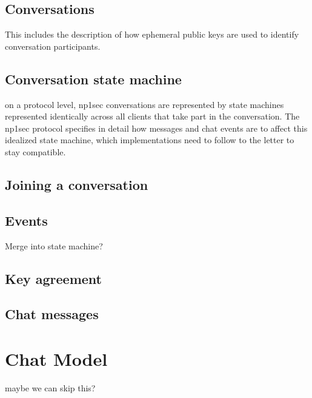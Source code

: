 \documentclass{article}
\begin{document}

\subsection{Conversations}
This includes the description of how ephemeral public keys are used to identify conversation participants.


\subsection{Conversation state machine}
on a protocol level, np1sec conversations are represented by state machines represented identically across all clients that take part in the conversation. The np1sec protocol specifies in detail how messages and chat events are to affect this idealized state machine, which implementations need to follow to the letter to stay compatible.


\subsection{Joining a conversation}


\subsection{Events}
Merge into state machine?


\subsection{Key agreement}


\subsection{Chat messages}








\section{Chat Model}
\label{sec:chat-model}

maybe we can skip this?



\end{document}
